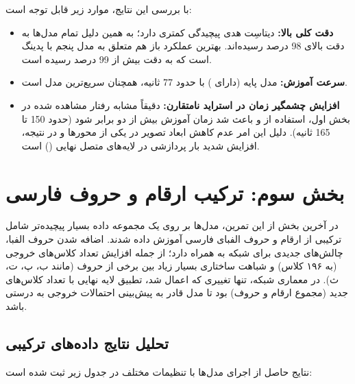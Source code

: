 \documentclass[12pt, a4paper]{article}
\begin{document}
	با بررسی این نتایج، موارد زیر قابل توجه است:
	
	\begin{itemize}
		\item \textbf{دقت کلی بالا:} دیتاسِت هدی پیچیدگی کمتری دارد؛ به همین دلیل
		تمام مدل‌ها به دقت بالای 98 درصد رسیده‌اند. بهترین عملکرد باز هم متعلق به مدل
		پنجم با پدینگ  است که به دقت بیش از 99 درصد رسیده است.
		
		\item \textbf{سرعت آموزش:} مدل پایه (دارای ) با حدود 77 ثانیه، همچنان
		سریع‌ترین مدل است.
		
		\item \textbf{افزایش چشمگیر زمان در استراید نامتقارن:} دقیقاً مشابه رفتار
		مشاهده شده در بخش اول، استفاده از  و  باعث شد
		زمان آموزش بیش از دو برابر شود (حدود 150 تا 165 ثانیه). دلیل این امر عدم کاهش
		ابعاد تصویر در یکی از محورها و در نتیجه، افزایش شدید بار پردازشی در لایه‌های
		متصل نهایی () است.
	\end{itemize}
	
	\pagebreak
	
	\section{بخش سوم: ترکیب ارقام و حروف فارسی}
	
	در آخرین بخش از این تمرین، مدل‌ها بر روی یک مجموعه داده بسیار پیچیده‌تر شامل ترکیبی
	از ارقام و حروف الفبای فارسی آموزش داده شدند. اضافه شدن حروف الفبا، چالش‌های
	جدیدی برای شبکه به همراه دارد؛ از جمله افزایش تعداد کلاس‌های خروجی (به ۱۹۶ کلاس)
	و شباهت ساختاری بسیار زیاد بین برخی از حروف (مانند ب، پ، ت، ث). در معماری شبکه،
	تنها تغییری که اعمال شد، تطبیق لایه  نهایی با تعداد کلاس‌های جدید (مجموع
	ارقام و حروف) بود تا مدل قادر به پیش‌بینی احتمالات خروجی به درستی باشد.
	
	\subsection{تحلیل نتایج داده‌های ترکیبی}
	
	نتایج حاصل از اجرای مدل‌ها با تنظیمات مختلف در جدول زیر ثبت شده است:
	
\end{document}
